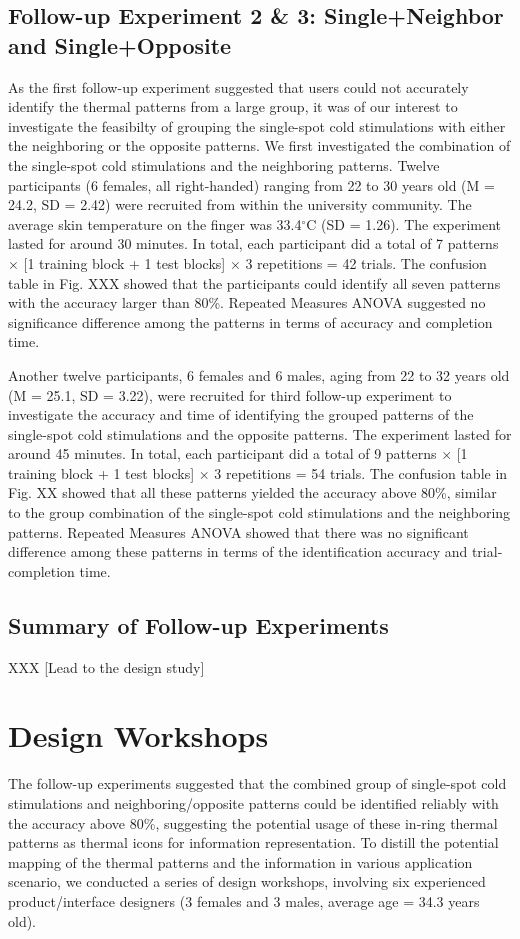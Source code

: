 \documentclass[preprint,12pt]{elsarticle}
\begin{document}
\subsection{Follow-up Experiment 2 \& 3: Single+Neighbor and Single+Opposite}
As the first follow-up experiment suggested that users could not accurately identify the thermal patterns from a large group, it was of our interest to investigate the feasibilty of grouping the single-spot cold stimulations with either the neighboring or the opposite patterns. We first investigated the combination of the single-spot cold stimulations and the neighboring patterns. Twelve participants (6 females, all right-handed) ranging from 22 to 30 years old (M = 24.2, SD = 2.42) were recruited from within the university community. The average skin temperature on the finger was 33.4$^{\circ}$C (SD = 1.26). The experiment lasted for around 30 minutes. In total, each participant did a total of 7 patterns $\times$ [1 training block + 1 test blocks] $\times$ 3 repetitions = 42 trials.  The confusion table in Fig. XXX showed that the participants could identify all seven patterns with the accuracy larger than 80\%. Repeated Measures ANOVA suggested no significance difference among the patterns in terms of accuracy and completion time. 

Another twelve participants, 6 females and 6 males, aging from 22 to 32 years old (M = 25.1, SD = 3.22), were recruited for third follow-up experiment to investigate the accuracy and time of identifying the grouped patterns of the single-spot cold stimulations and the opposite patterns. The experiment lasted for around 45 minutes. In total, each participant did a total of 9 patterns $\times$ [1 training block + 1 test blocks] $\times$ 3 repetitions = 54 trials. The confusion table in Fig. XX showed that all these patterns yielded the accuracy above 80\%, similar to the group combination of the single-spot cold stimulations and the neighboring patterns. Repeated Measures ANOVA showed that there was no significant difference among these patterns in terms of the identification accuracy and trial-completion time.

\subsection{Summary of Follow-up Experiments}
XXX
[Lead to the design study]

\section{Design Workshops}
The follow-up experiments suggested that the combined group of single-spot cold stimulations and neighboring/opposite patterns could be identified reliably with the accuracy above 80\%, suggesting the potential usage of these in-ring thermal patterns as thermal icons for information representation. To distill the potential mapping of the thermal patterns and the information in various application scenario, we conducted a series of design workshops, involving six experienced product/interface designers (3 females and 3 males, average age = 34.3 years old).
\end{document}
